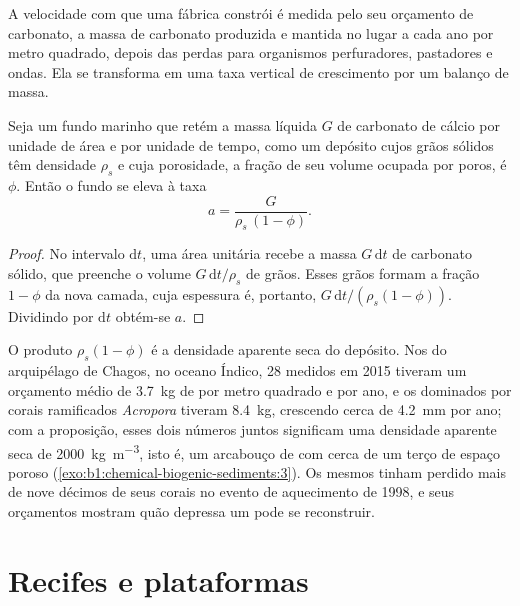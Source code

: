 A velocidade com que uma fábrica constrói é medida pelo seu orçamento de carbonato, a
massa de carbonato produzida e mantida no lugar a cada ano por metro quadrado, depois
das perdas para organismos perfuradores, pastadores e ondas. Ela se transforma em uma
taxa vertical de crescimento por um balanço de massa.

\begin{proposition}\label{prop:b1:chemical-biogenic-sediments:accretion}
Seja um fundo marinho que retém a massa líquida $G$ de carbonato de cálcio por unidade
de área e por unidade de tempo, como um depósito cujos grãos sólidos têm densidade
$\rho_s$ e cuja porosidade, a fração de seu volume ocupada por poros, é $\phi$. Então o
fundo se eleva à taxa
\[
a = \frac{G}{\rho_s\,(1-\phi)}.
\]
\end{proposition}

\begin{proof}
No intervalo $\mathrm dt$, uma área unitária recebe a massa $G\,\mathrm dt$ de carbonato
sólido, que preenche o volume $G\,\mathrm dt/\rho_s$ de grãos. Esses grãos formam a
fração $1-\phi$ da nova camada, cuja espessura é, portanto,
$G\,\mathrm dt/(\rho_s(1-\phi))$. Dividindo por $\mathrm dt$ obtém-se $a$.
\end{proof}

O produto $\rho_s(1-\phi)$ é a densidade aparente seca do depósito. Nos  do
arquipélago de Chagos, no oceano Índico, 28  medidos em 2015 tiveram um orçamento
médio de \qty{3.7}{kg} de  por metro quadrado e por ano, e os dominados por
corais ramificados \emph{Acropora} tiveram \qty{8.4}{kg}, crescendo cerca de
\qty{4.2}{mm} por ano; com a proposição, esses dois números juntos significam uma
densidade aparente seca de \qty{2000}{kg.m^{-3}}, isto é, um arcabouço de  com cerca
de um terço de espaço poroso (\cref{exo:b1:chemical-biogenic-sediments:3}). Os mesmos
 tinham perdido mais de nove décimos de seus corais no evento de aquecimento de
1998, e seus orçamentos mostram quão depressa um  pode se reconstruir.

\section{Recifes e plataformas}\label{sec:b1:chemical-biogenic-sediments:reefs}

